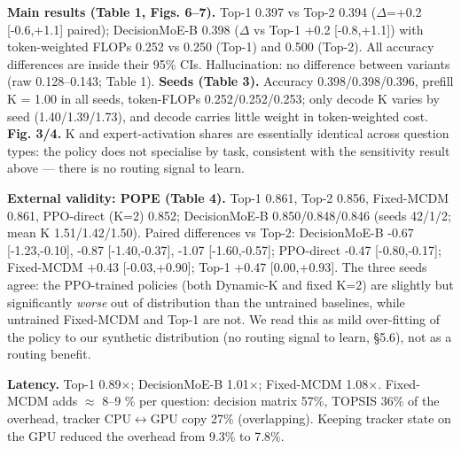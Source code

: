 \textbf{Main results (Table 1, Figs. 6--7).}
Top-1 0.397 vs Top-2 0.394 ($\Delta$=+0.2 {[}-0.6,+1.1{]} paired); DecisionMoE-B 0.398 ($\Delta$ vs Top-1 +0.2 {[}-0.8,+1.1{]}) with token-weighted
FLOPs 0.252 vs 0.250 (Top-1) and 0.500 (Top-2). All accuracy differences are inside their 95\% CIs. Hallucination: no difference
between variants (raw 0.128--0.143; Table 1).
\textbf{Seeds (Table 3).} Accuracy 0.398/0.398/0.396, prefill K = 1.00 in all seeds, token-FLOPs 0.252/0.252/0.253;
only decode K varies by seed (1.40/1.39/1.73), and decode carries little weight in token-weighted cost.
\textbf{Fig. 3/4.} K and expert-activation shares are essentially identical across question types: the policy does not specialise
by task, consistent with the sensitivity result above --- there is no routing signal to learn.

\textbf{External validity: POPE (Table 4).}
Top-1 0.861, Top-2 0.856, Fixed-MCDM 0.861, PPO-direct (K=2) 0.852; DecisionMoE-B 0.850/0.848/0.846 (seeds 42/1/2; mean K 1.51/1.42/1.50).
Paired differences vs Top-2: DecisionMoE-B -0.67 {[}-1.23,-0.10{]}, -0.87 {[}-1.40,-0.37{]}, -1.07 {[}-1.60,-0.57{]}; PPO-direct -0.47 {[}-0.80,-0.17{]};
Fixed-MCDM +0.43 {[}-0.03,+0.90{]}; Top-1 +0.47 {[}0.00,+0.93{]}. The three seeds agree: the PPO-trained policies (both Dynamic-K and fixed K=2)
are slightly but significantly \emph{worse} out of distribution than the untrained baselines, while untrained Fixed-MCDM and Top-1 are not.
We read this as mild over-fitting of the policy to our synthetic distribution (no routing signal to learn, §5.6), not as a routing benefit.

\textbf{Latency.}
Top-1 0.89$\times$; DecisionMoE-B 1.01$\times$; Fixed-MCDM 1.08$\times$. Fixed-MCDM adds $\approx$ 8--9 \% per question: decision matrix 57\%, TOPSIS 36\% of
the overhead, tracker CPU$\leftrightarrow$GPU copy 27\% (overlapping). Keeping tracker state on the GPU reduced the overhead from 9.3\% to 7.8\%.


